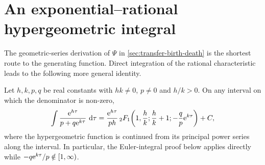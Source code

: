 \section{An exponential--rational hypergeometric integral}
\label{app:hypergeometric-integral}

The geometric-series derivation of \(\Psi\) in
\cref{sec:transfer-birth-death} is the shortest route to the generating function.
Direct integration of the rational characteristic leads to the following more
general identity.

\begin{proposition}
\label{prop:hypergeometric-integral}
Let \(h,k,p,q\) be real constants with \(hk\neq0\), \(p\neq0\) and
\(h/k>0\).  On any interval on which the denominator is non-zero,
\begin{equation}
  \int
  \frac{\mathrm{e}^{h\tau}}{p+q\mathrm{e}^{k\tau}}\,\,\mathrm{d}\tau
  =
  \frac{\mathrm{e}^{h\tau}}{ph}\,
  {}_2F_1\!\left(
    1,\frac hk;\frac hk+1;
    -\frac qp\mathrm{e}^{k\tau}
  \right)+C,
  \label{eq:hypergeometric-integral}
\end{equation}
where the hypergeometric function is continued from its principal power series
along the interval.  In particular, the Euler-integral proof below applies
directly while
\(-q\mathrm{e}^{k\tau}/p\notin[1,\infty)\).
\end{proposition}

